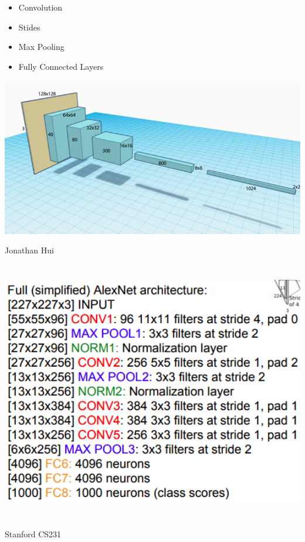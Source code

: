 {\begin{itemize}
  \vfill
\item Convolution

  \vfill
\item Stides

  \vfill
\item Max Pooling

  \vfill
\item Fully Connected Layers
\end{itemize}


\centerline{\includegraphics[width= 8.5in]{../images/Stack}}
\centerline{\large Jonathan Hui}

\centerline{\includegraphics[height=4.5in]{../images/AlexnetStack}}
\centerline{\large Stanford CS231}


}
